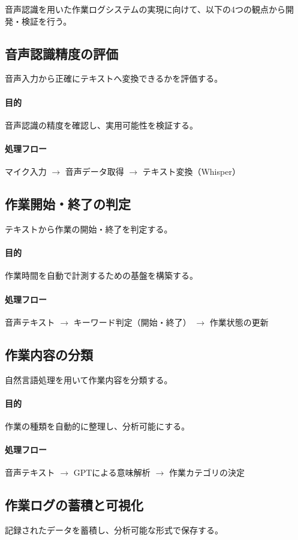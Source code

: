 \documentclass[a4paper,12pt,ja=standard,lualatex]{bxjsarticle}
\begin{document}
音声認識を用いた作業ログシステムの実現に向けて、以下の4つの観点から開発・検証を行う。

\subsection{音声認識精度の評価}
音声入力から正確にテキストへ変換できるかを評価する。
\paragraph{目的}
音声認識の精度を確認し、実用可能性を検証する。
\paragraph{処理フロー}
マイク入力 $\rightarrow$ 音声データ取得 $\rightarrow$ テキスト変換（Whisper）

\subsection{作業開始・終了の判定}
テキストから作業の開始・終了を判定する。
\paragraph{目的}
作業時間を自動で計測するための基盤を構築する。
\paragraph{処理フロー}
音声テキスト $\rightarrow$ キーワード判定（開始・終了） $\rightarrow$ 作業状態の更新

\subsection{作業内容の分類}
自然言語処理を用いて作業内容を分類する。
\paragraph{目的}
作業の種類を自動的に整理し、分析可能にする。
\paragraph{処理フロー}
音声テキスト $\rightarrow$ GPTによる意味解析 $\rightarrow$ 作業カテゴリの決定

\subsection{作業ログの蓄積と可視化}
記録されたデータを蓄積し、分析可能な形式で保存する。
\end{document}
